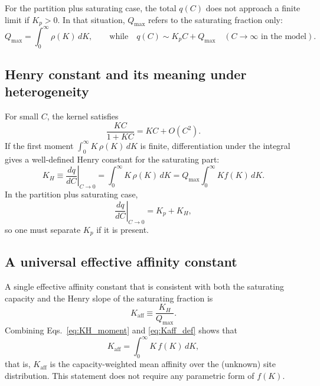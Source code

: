 \documentclass[12pt]{article}
\begin{document}
	For the partition plus saturating case, the total $q(C)$ does not approach a finite limit if $K_p>0$. In that situation, $Q_{\max}$ refers to the saturating fraction only:
	\begin{equation}
		Q_{\max} = \int_0^\infty \rho(K)\,dK,
		\qquad
		\text{while}\quad
		q(C)\sim K_p C + Q_{\max}\quad (C \to \infty \text{ in the model}).
	\end{equation}
	
	\subsection{Henry constant and its meaning under heterogeneity}
	
	For small $C$, the kernel satisfies
	\[
	\frac{K C}{1+K C} = K C + O(C^2).
	\]
	If the first moment $\int_0^\infty K\,\rho(K)\,dK$ is finite, differentiation under the integral gives a well-defined Henry constant for the saturating part:
	\begin{equation}
		K_H \equiv \left.\frac{dq}{dC}\right|_{C\to 0}
		= \int_0^\infty K\,\rho(K)\,dK
		= Q_{\max}\int_0^\infty K f(K)\,dK.
		\label{eq:KH_moment}
	\end{equation}
	In the partition plus saturating case,
	\begin{equation}
		\left.\frac{dq}{dC}\right|_{C\to 0} = K_p + K_H,
		\label{eq:KH_total_partition}
	\end{equation}
	so one must separate $K_p$ if it is present.
	
	\subsection{A universal effective affinity constant}
	
	A single effective affinity constant that is consistent with both the saturating capacity and the Henry slope of the saturating fraction is
	\begin{equation}
		K_{\mathrm{aff}} \equiv \frac{K_H}{Q_{\max}}.
		\label{eq:Kaff_def}
	\end{equation}
	Combining Eqs.~\eqref{eq:KH_moment} and \eqref{eq:Kaff_def} shows that
	\begin{equation}
		K_{\mathrm{aff}} = \int_0^\infty K\,f(K)\,dK,
		\label{eq:Kaff_mean}
	\end{equation}
	that is, $K_{\mathrm{aff}}$ is the capacity-weighted mean affinity over the (unknown) site distribution. This statement does not require any parametric form of $f(K)$.
	
\end{document}
